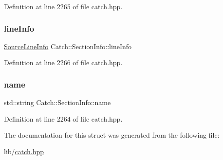 Definition at line 2265 of file catch.\+hpp.

\hypertarget{struct_catch_1_1_section_info_adbc83b8a3507c4acc8ee249e93465711}{}\label{struct_catch_1_1_section_info_adbc83b8a3507c4acc8ee249e93465711} 
\subsubsection{\texorpdfstring{line\+Info}{lineInfo}}
{\footnotesize\ttfamily \hyperlink{struct_catch_1_1_source_line_info}{Source\+Line\+Info} Catch\+::\+Section\+Info\+::line\+Info}



Definition at line 2266 of file catch.\+hpp.

\hypertarget{struct_catch_1_1_section_info_a704c8fc662d309137e0d4f199cb7df58}{}\label{struct_catch_1_1_section_info_a704c8fc662d309137e0d4f199cb7df58} 
\subsubsection{\texorpdfstring{name}{name}}
{\footnotesize\ttfamily std\+::string Catch\+::\+Section\+Info\+::name}



Definition at line 2264 of file catch.\+hpp.



The documentation for this struct was generated from the following file\+:\begin{DoxyCompactItemize}
\item 
lib/\hyperlink{catch_8hpp}{catch.\+hpp}\end{DoxyCompactItemize}
